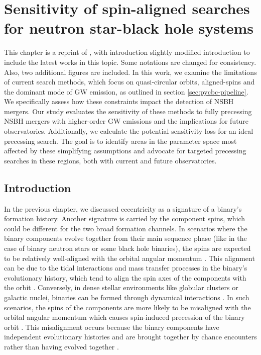 \chapter{Sensitivity of spin-aligned searches for neutron star-black hole systems}


This chapter is a reprint of \cite{Dhurkunde:2022aek}, with introduction slightly modified introduction to include the latest works in this topic. Some notations are changed for consistency. Also, two additional figures are included. In this work, we examine the limitations of current search methods, which focus on quasi-circular orbits, aligned-spins and the dominant mode of GW emission, as outlined in section \ref{sec:pycbc-pipeline}. We specifically assess how these constraints impact the detection of NSBH mergers. Our study evaluates the sensitivity of these methods to fully precessing NSBH mergers with higher-order GW emissions and the implications for future observatories. Additionally, we calculate the potential sensitivity loss for an ideal precessing search. The goal is to identify areas in the parameter space most affected by these simplifying assumptions and advocate for targeted precessing searches in these regions, both with current and future observatories.

\section{Introduction}
In the previous chapter, we discussed eccentricity as a signature of a binary's formation history. Another signature is carried by the component spins, which could be different for the two broad formation channels.  In scenarios where the binary components evolve together from their main sequence phase (like in the case of binary neutron stars or some black hole binaries), the spins are expected to be relatively well-aligned with the orbital angular momentum \cite{Broekgaarden:2021hlu, Belczynski:2010tb, Dominik:2012kk}. This alignment can be due to the tidal interactions and mass transfer processes in the binary’s evolutionary history, which tend to align the spin axes of the components with the orbit \cite{Kalogera:1999tq,Gerosa:2018wbw}. Conversely, in dense stellar environments like globular clusters or galactic nuclei, binaries can be formed through dynamical interactions \cite{Rodriguez:2017pec,Sedda:2020wzl,  Wang:2020jsx, Santoliquido:2020bry}. In such scenarios, the spins of the components are more likely to be misaligned with the orbital angular momentum which causes spin-induced precession of the binary orbit \cite{Pooley:2003zb, Rodriguez:2015oxa}. This misalignment occurs because the binary components have independent evolutionary histories and are brought together by chance encounters rather than having evolved together \cite{Rodriguez:2016vmx}. 

